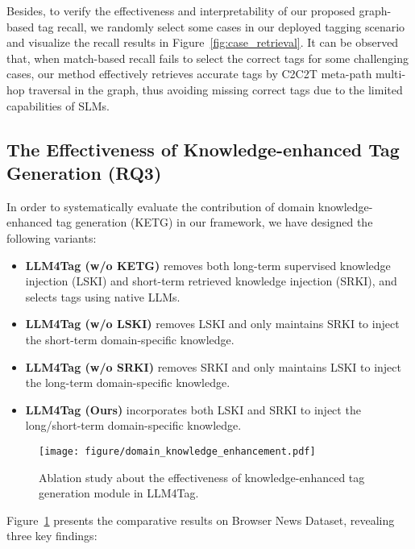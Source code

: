 Besides, to verify the effectiveness and interpretability of our proposed graph-based tag recall, we randomly select some cases in our deployed tagging scenario and visualize the recall results in Figure~\ref{fig:case_retrieval}.
It can be observed that, when match-based recall fails to select the correct tags for some challenging cases, our method effectively retrieves accurate tags by C2C2T meta-path multi-hop traversal in the graph, thus avoiding missing correct tags due to the limited capabilities of SLMs.




\subsection{The Effectiveness of Knowledge-enhanced Tag Generation (RQ3)}
In order to systematically evaluate the contribution of domain knowledge-enhanced tag generation (KETG) in our framework, we have designed the following variants:

\begin{itemize}[leftmargin = 12 pt]
\item \textbf{LLM4Tag (w/o KETG)} removes both long-term supervised knowledge injection (LSKI) and short-term retrieved knowledge injection (SRKI), and selects tags using native LLMs.
\item \textbf{LLM4Tag (w/o LSKI)} removes LSKI and only maintains SRKI to inject the short-term domain-specific knowledge.
\item \textbf{LLM4Tag (w/o SRKI)} removes SRKI and only maintains LSKI to inject the long-term domain-specific knowledge.
\item \textbf{LLM4Tag (Ours)} incorporates both LSKI and SRKI to inject the long/short-term domain-specific knowledge.
\end{itemize}

\begin{figure}[h]
    \centering
    \texttt{[image: figure/domain\_knowledge\_enhancement.pdf]}
    \caption{Ablation study about the effectiveness of knowledge-enhanced tag generation module in LLM4Tag.}
    \label{fig:dke}
\end{figure}
Figure~\ref{fig:dke} presents the comparative results on Browser News Dataset, revealing three key findings:

